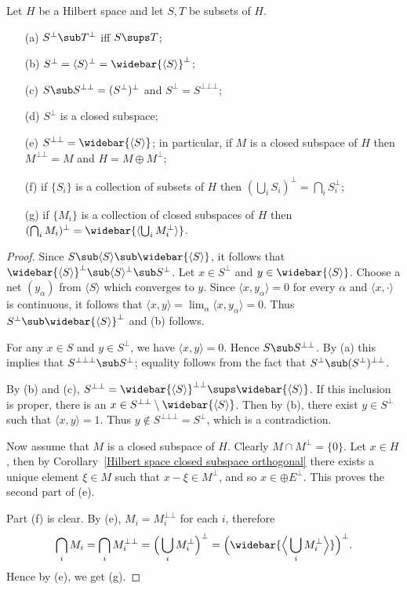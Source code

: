 \begin{proposition}\label{Hilbert space orthogonal complement prop}
Let $H$ be a Hilbert space and let $S,T$ be subsets of $H$.
\begin{itemize}
\item[(a)] $S^\bot\sub T^\bot$ iff $S\sups T$;
\item[(b)] $S^\bot=\langle S\rangle^\bot=\widebar{\langle S\rangle}^\bot$;
\item[(c)] $S\sub S^{\bot\bot}=(S^\bot)^\bot$ and $S^\bot=S^{\bot\bot\bot}$;  
\item[(d)] $S^\bot$ is a closed subspace;
\item[(e)] $S^{\bot\bot}=\widebar{\langle S\rangle}$; in particular, if $M$ is a closed subspace of $H$ then $M^{\bot\bot}=M$ and $H=M\oplus M^\bot$;
\item[(f)] if $\{S_i\}$ is a collection of subsets of $H$ then $(\bigcup_iS_i)^\bot=\bigcap_iS_i^\bot$;
\item[(g)] if $\{M_i\}$ is a collection of closed subspaces of $H$ then $(\bigcap_iM_i)^\bot=\widebar{\langle\bigcup_iM_i^\bot\rangle}$.
\end{itemize}
\end{proposition}
\begin{proof}
Since $S\sub\langle S\rangle\sub\widebar{\langle S\rangle}$, it follows that $\widebar{\langle S\rangle}^\bot\sub\langle S\rangle^\bot\sub S^\bot$. Let $x\in S^\bot$ and $y\in\widebar{\langle S\rangle}$. Choose a net $(y_\alpha)$ from $\langle S\rangle$ which converges to $y$. Since $\langle x,y_\alpha\rangle=0$ for every $\alpha$ and $\langle x,\cdot\rangle$ is continuous, it follows that $\langle x,y\rangle=\lim_\alpha\langle x,y_\alpha\rangle=0$. Thus $S^\bot\sub\widebar{\langle S\rangle}^\bot$ and (b) follows.\par
For any $x\in S$ and $y\in S^\bot$, we have $\langle x,y\rangle=0$. Hence $S\sub S^{\bot\bot}$. By (a) this implies that $S^{\bot\bot\bot}\sub S^{\bot}$; equality follows from the fact that $S^\bot\sub(S^\bot)^{\bot\bot}$.\par
By (b) and (c), $S^{\bot\bot}=\widebar{\langle S\rangle}^{\bot\bot}\sups\widebar{\langle S\rangle}$. If this inclusion is proper, there is an $x\in S^{\bot\bot}\setminus\widebar{\langle S\rangle}$. Then by (b), there exist $y\in S^\bot$ such that $\langle x,y\rangle=1$. Thus $y\notin S^{\bot\bot\bot}=S^\bot$, which is a contradiction.\par
Now assume that $M$ is a closed subspace of $H$. Clearly $M\cap M^\bot=\{0\}$. Let $x\in H$, then by Corollary~\ref{Hilbert space closed subspace orthogonal} there exists a unique element $\xi\in M$ such that $x-\xi\in M^{\bot}$, and so $x\in \oplus E^\bot$. This proves the second part of (e).\par
Part (f) is clear. By (e), $M_i=M_i^{\bot\bot}$ for each $i$, therefore
\begin{align*}
\bigcap_iM_i=\bigcap_iM_i^{\bot\bot}=\Big(\bigcup_iM_i^\bot\Big)^{\bot}=\Big(\widebar{\Big\langle\bigcup_iM_i^\bot\Big\rangle}\Big)^\bot.
\end{align*}
Hence by (e), we get (g).
\end{proof}
